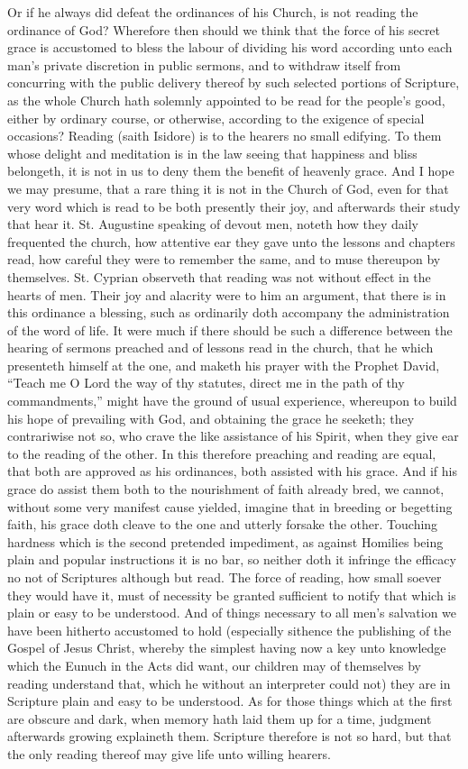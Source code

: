 Or if he always did defeat the ordinances of his Church, is not reading the ordinance of God? Wherefore then should we think that the force of his secret grace is accustomed to bless the labour of dividing his word according unto each man’s private discretion in public sermons, and to withdraw itself from concurring with the public delivery thereof by such selected portions of Scripture, as the whole Church hath solemnly appointed to be read for the people’s good, either by ordinary course, or otherwise, according to the exigence of special occasions? Reading (saith Isidore) is to the hearers no small edifying. To them whose delight and meditation is  in the law seeing that happiness and bliss belongeth, it is not in us to deny them the benefit of heavenly grace. And I hope we may presume, that a rare thing it is not in the Church of God, even for that very word which is read to be both presently their joy, and afterwards their study that hear it. St. Augustine speaking of devout men, noteth how they daily frequented the church, how attentive ear they gave unto the lessons and chapters read, how careful they were to remember the same, and to muse thereupon by themselves. St. Cyprian observeth that reading was not without effect in the hearts of men. Their joy and alacrity were to him an argument, that there is in this ordinance a blessing, such as ordinarily doth accompany the administration of the word of life.
It were much if there should be such a difference between the hearing of sermons preached and of lessons read in the church, that he which presenteth himself at the one, and maketh his prayer with the Prophet David, “Teach me O Lord the way of thy statutes, direct me in the path of thy commandments,” might have the ground of usual experience, whereupon to build his hope of prevailing with God, and obtaining the grace he seeketh; they contrariwise not so, who crave the like assistance of his Spirit, when they give ear to the reading of the other. In this therefore preaching and reading are equal, that both are approved as his ordinances, both assisted with his grace. And if his grace do assist them both to the nourishment of faith already bred, we cannot, without some very manifest cause yielded, imagine that in breeding or begetting faith, his grace doth cleave to the one and utterly forsake the other.
Touching hardness which is the second pretended impediment, as against Homilies being plain and popular instructions it is no bar, so neither doth it infringe the efficacy no not of Scriptures although but read. The force of reading, how small soever they would have it, must of necessity be granted sufficient to notify that which is plain or easy to be understood. And of things necessary to all men’s salvation we have been hitherto accustomed to hold (especially sithence the publishing of the Gospel of Jesus Christ, whereby the simplest having now a key unto knowledge which the Eunuch in the Acts did want, our children may of themselves  by reading understand that, which he without an interpreter could not) they are in Scripture plain and easy to be understood. As for those things which at the first are obscure and dark, when memory hath laid them up for a time, judgment afterwards growing explaineth them. Scripture therefore is not so hard, but that the only reading thereof may give life unto willing hearers.
